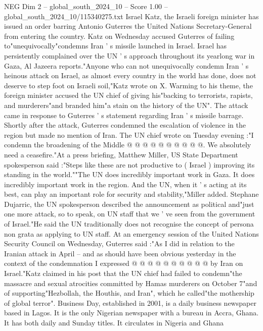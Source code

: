 \begin{textsample}{NEG Dim 2 – global\_south\_2024\_10 – Score 1.00 – global\_south\_2024\_10/115340275.txt}  \label{ex:f2_neg_318}
Israel Katz, the Israeli foreign minister has issued an order barring Antonio Guterres the United Nations Secretary-General from entering the country.
Katz on Wednesday accused Guterres of failing to"unequivocally"condemns Iran ' s missile launched in Israel.
Israel has persistently complained over the UN ' s approach throughout its yearlong war in Gaza, Al Jazeera reports."Anyone who can not unequivocally condemn Iran ' s heinous attack on Israel, as almost every country in the world has done, does not deserve to step foot on Israeli soil,"Katz wrote on X.
Warming to his theme, the foreign minister accused the UN chief of giving his"backing to terrorists, rapists, and murderers"and branded him"a stain on the history of the UN".
The attack came in response to Guterres ' s statement regarding Iran ' s missile barrage.
Shortly after the attack, Guterres condemned the escalation of violence in the region but made no mention of Iran.
The UN chief wrote on Tuesday evening :"I condemn the broadening of the Middle @ @ @ @ @ @ @ @ @ @.
We absolutely need a ceasefire."At a press briefing, Matthew Miller, US State Department spokesperson said :"Steps like these are not productive to ( Israel ) improving its standing in the world.""The UN does incredibly important work in Gaza.
It does incredibly important work in the region.
And the UN, when it ' s acting at its best, can play an important role for security and stability,"Miller added.
Stephane Dujarric, the UN spokesperson described the announcement as political and"just one more attack, so to speak, on UN staff that we ' ve seen from the government of Israel."He said the UN traditionally does not recognise the concept of persona non grata as applying to UN staff.
At an emergency session of the United Nations Security Council on Wednesday, Guterres said :"As I did in relation to the Iranian attack in April -- and as should have been obvious yesterday in the context of the condemnation I expressed @ @ @ @ @ @ @ @ @ @ by Iran on Israel."Katz claimed in his post that the UN chief had failed to condemn"the massacre and sexual atrocities committed by Hamas murderers on October 7"and of supporting"Hezbollah, the Houthis, and Iran", which he called"the mothership of global terror".
Business Day, established in 2001, is a daily business newspaper based in Lagos.
It is the only Nigerian newspaper with a bureau in Accra, Ghana.
It has both daily and Sunday titles.
It circulates in Nigeria and Ghana

\end{textsample}
